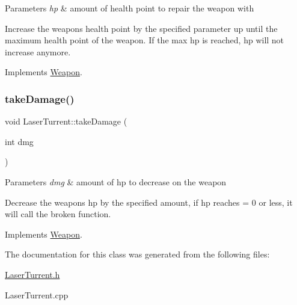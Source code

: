 \begin{DoxyParams}{Parameters}
{\em hp} & amount of health point to repair the weapon with\\
\hline
\end{DoxyParams}
Increase the weapons health point by the specified parameter up until the maximum health point of the weapon. If the max hp is reached, hp will not increase anymore. 

Implements \hyperlink{classWeapon}{Weapon}.

\mbox{\label{classLaserTurrent_a8f84af30ae6040de5c5d291dc890d804}} 
\subsubsection{\texorpdfstring{take\+Damage()}{takeDamage()}}
{\footnotesize\ttfamily void Laser\+Turrent\+::take\+Damage (\begin{DoxyParamCaption}\item[{int}]{dmg }\end{DoxyParamCaption})\hspace{0.3cm}{\ttfamily [virtual]}}


\begin{DoxyParams}{Parameters}
{\em dmg} & amount of hp to decrease on the weapon\\
\hline
\end{DoxyParams}
Decrease the weapons hp by the specified amount, if hp reaches = 0 or less, it will call the broken function. 

Implements \hyperlink{classWeapon}{Weapon}.



The documentation for this class was generated from the following files\+:\begin{DoxyCompactItemize}
\item 
\hyperlink{LaserTurrent_8h}{Laser\+Turrent.\+h}\item 
Laser\+Turrent.\+cpp\end{DoxyCompactItemize}
